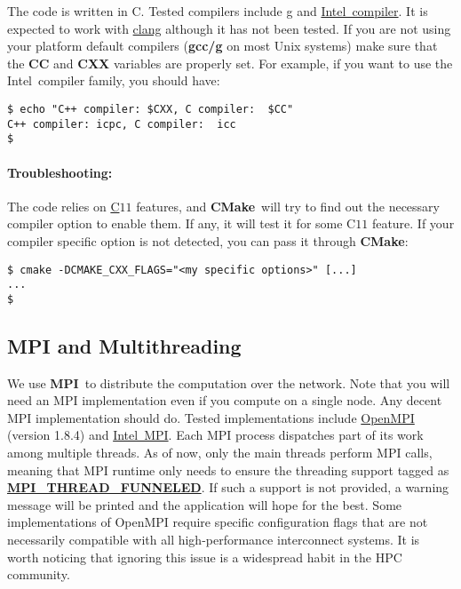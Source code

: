 \documentclass[twoside,final,onecolumn]{article}
\newcommand{\intel}{Intel\textregistered}
\newcommand{\MPI}{\textbf{MPI}}
\newcommand{\CXX}{C\nolinebreak\hspace{-.05em}\raisebox{.4ex}{\tiny\bf +}\nolinebreak\hspace{-.10em}\raisebox{.4ex}{\tiny\bf +}}
\newcommand{\gxx}{g\nolinebreak\hspace{-.05em}\raisebox{.4ex}{\tiny\bf +}\nolinebreak\hspace{-.10em}\raisebox{.4ex}{\tiny\bf +}}
\newcommand{\cmake}{\textbf{CMake}}
\begin{document}
The code is written in \CXX. Tested compilers include \href{https://gcc.gnu.org/}{\gxx} and \href{https://software.intel.com/en-us/c-compilers}{\intel\ compiler}. It is expected to work with \href{http://clang.llvm.org/}{clang} although it has not been tested.
\newline
\newline
If you are not using your platform default compilers ({\bf gcc/\gxx} on most Unix systems) make sure that the {\bf CC} and {\bf CXX} variables are properly set. For example, if you want to use the \intel\ compiler family, you should have:
\begin{framed}
\begin{verbatim}
$ echo "C++ compiler: $CXX, C compiler:  $CC"
C++ compiler: icpc, C compiler:  icc
$ 
\end{verbatim}
\end{framed}

\paragraph{Troubleshooting:}
The code relies on \href{http://www.stroustrup.com/C++11FAQ.html}{\CXX$11$} features, and
\cmake\ will try to find out the necessary compiler option to enable them. If any, it will test it for some \CXX $11$ feature.
If your compiler specific option is not detected, you can pass it through \cmake:
\begin{framed}
\begin{verbatim}
$ cmake -DCMAKE_CXX_FLAGS="<my specific options>" [...]
...
$
\end{verbatim}
\end{framed}

\subsection{MPI and Multithreading}

We use \MPI\ to distribute the computation over the network. Note that you will need an MPI implementation even if you compute on a single node.
Any decent MPI implementation should do. Tested implementations include \href{http://www.open-mpi.org}{OpenMPI} (version 1.8.4) and \href{https://software.intel.com/en-us/intel-mpi-library}{\intel \ MPI}.
\newline
\newline
Each MPI process dispatches part of its work among multiple threads. As of now, only the main threads perform MPI calls,
meaning that MPI runtime only needs to ensure the threading support tagged as \href{http://www.mpi-forum.org/docs/mpi-2.2/mpi22-report/node260.htm}{\textbf{MPI\_THREAD\_FUNNELED}}.
If such a support is not provided, a warning message will be printed and the application will hope for the best.
\newline
\newline
Some implementations of OpenMPI require specific configuration flags that are not necessarily compatible with all high-performance interconnect systems.
It is worth noticing that ignoring this issue is a widespread habit in the HPC community.
\end{document}
